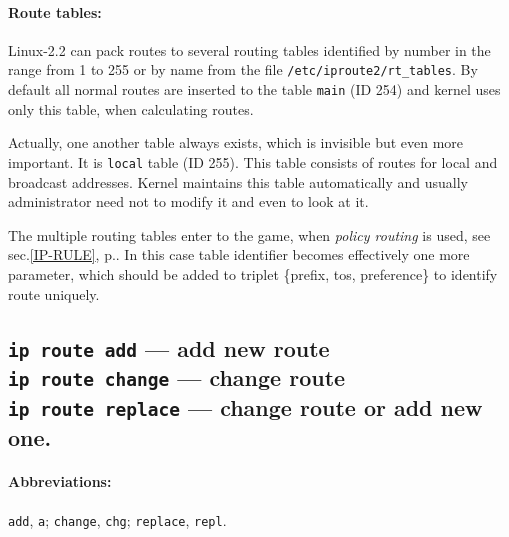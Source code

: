 \paragraph{Route tables:} Linux-2.2 can pack routes to several routing
tables identified by number in the range from 1 to 255 or by
name from the file \verb|/etc/iproute2/rt_tables|. By default all normal
routes are inserted to the table \verb|main| (ID 254) and kernel uses
only this table, when calculating routes.

Actually, one another table always exists, which is invisible but
even more important. It is \verb|local| table (ID 255). This table
consists of routes for local and broadcast addresses. Kernel maintains
this table automatically and usually administrator need not to modify it
and even to look at it.

The multiple routing tables enter to the game, when {\em policy routing\/}
is used, see sec.\ref{IP-RULE}, p.\pageref{IP-RULE}.
In this case table identifier becomes
effectively one more parameter, which should be added to triplet
\{prefix, tos, preference\} to identify route uniquely.


\subsection{{\tt ip route add} --- add new route\\
	{\tt ip route change} --- change route\\
	{\tt ip route replace} --- change route or add new one.}
\label{IP-ROUTE-ADD}

\paragraph{Abbreviations:} \verb|add|, \verb|a|; \verb|change|, \verb|chg|;
	\verb|replace|, \verb|repl|.


